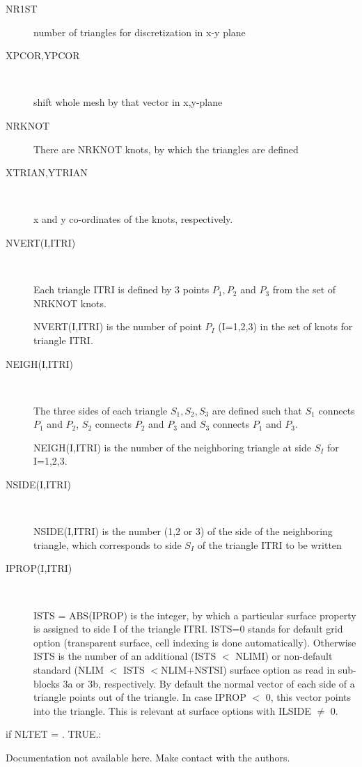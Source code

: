 \begin{description}
  \item[NR1ST] number of triangles for discretization in x-y plane
  \item[XPCOR,YPCOR] ~ 

        shift whole mesh by that vector in x,y-plane
  \item[NRKNOT] There are NRKNOT
        knots, by which the triangles are defined
  \item[XTRIAN,YTRIAN] ~

        x and y co-ordinates of the knots, respectively.
  \item[NVERT(I,ITRI)] ~ 

        Each triangle ITRI is defined by 3 points $P_1, P_2$ and $P_3$ from the set of
        NRKNOT knots.

        NVERT(I,ITRI) is the number of point $P_I$ (I=1,2,3) in the set of knots for
        triangle ITRI.
  \item[NEIGH(I,ITRI)] ~ 

        The three sides of each triangle $S_1, S_2, S_3$ are defined such that $S_1$
        connects $P_1$ and $P_2$, $S_2$ connects $P_2$ and $P_3$ and $S_3$ connects
        $P_1$ and $P_3$.

        NEIGH(I,ITRI) is the number of the neighboring triangle at side $S_I$ for
        I=1,2,3.
  \item[NSIDE(I,ITRI)] ~ 

        NSIDE(I,ITRI) is the number (1,2 or 3) of the side of the neighboring triangle,
        which corresponds to side $S_I$ of the triangle ITRI to be written
  \item[IPROP(I,ITRI)] ~ 

        ISTS = ABS(IPROP) is the integer, by which a particular surface property is
        assigned to side I of the triangle ITRI.
        ISTS=0 stands for default grid option (transparent surface, cell indexing is
        done automatically).
        Otherwise ISTS is the number of an additional (ISTS $<$ NLIMI) or non-default
        standard (NLIM $<$ ISTS $<$NLIM+NSTSI) surface option as read in sub-blocks 3a
        or 3b, respectively.
        By default the normal vector of each side of a triangle points out of the
        triangle.
        In case IPROP $<$ 0, this vector points into the triangle.
        This is relevant at surface options with ILSIDE $\not=$ 0.
\end{description}
if NLTET = .
TRUE.:

Documentation not available here.
Make contact with the authors.

